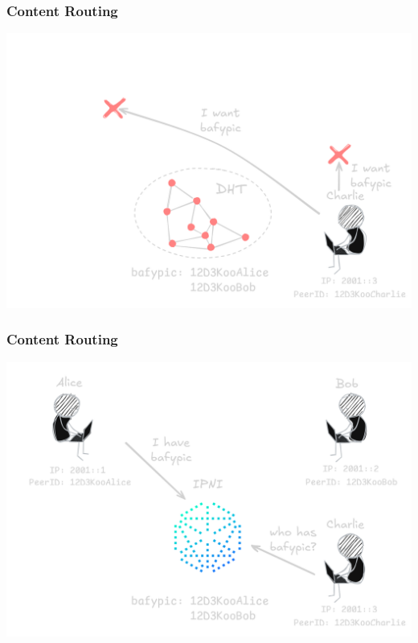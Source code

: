 \documentclass{../shipyard-slide}
\begin{document}
\begin{frame}
  \frametitle{Content Routing}
  \begin{center}
    \includegraphics[width=.7\textwidth]{resources/routing-no-providers.png}
  \end{center}
\end{frame}
\begin{frame}
  \frametitle{Content Routing}
  \begin{center}
    \includegraphics[width=.7\textwidth]{resources/routing-ipni.png}
  \end{center}
\end{frame}
\end{document}
